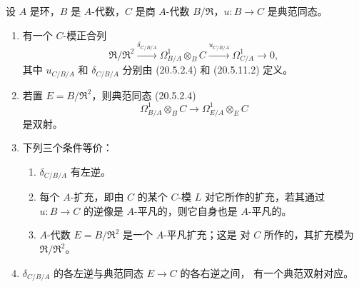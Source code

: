 \begin{theorem}[20.5.12]
\label{0.20.5.12-fr}
设 $A$ 是环，$B$ 是 $A$-代数，$C$ 是商 $A$-代数
$B/\mathfrak{R}$，$u:B\to C$ 是典范同态。
\begin{enumerate}
  \item[\rm(i)] 有一个 $C$-模正合列
\begin{equation}
\tag{20.5.12.1}
\label{0.20.5.12.1-fr}
  \mathfrak{R}/\mathfrak{R}^2
  \xrightarrow{\delta_{C/B/A}}\Omega^1_{B/A}\otimes_B C
  \xrightarrow{u_{C/B/A}}\Omega^1_{C/A}\longrightarrow 0,
\end{equation}
其中 $u_{C/B/A}$ 和 $\delta_{C/B/A}$ 分别由 (20.5.2.4) 和
(20.5.11.2) 定义。
  \item[\rm(ii)] 若置 $E=B/\mathfrak{R}^2$，则典范同态 (20.5.2.4)
\[
  \Omega^1_{B/A}\otimes_B C\longrightarrow
  \Omega^1_{E/A}\otimes_E C
\]
是双射。
  \item[\rm(iii)] 下列三个条件等价：
  \begin{enumerate}
    \item[\rm a)] $\delta_{C/B/A}$ 有左逆。
    \item[\rm b)] 每个 $A$-扩充，即由 $C$ 的某个 $C$-模 $L$ 对它所作的扩充，若其通过
    $u:B\to C$ 的逆像是 $A$-平凡的，则它自身也是 $A$-平凡的。
    \item[\rm c)] $A$-代数 $E=B/\mathfrak{R}^2$ 是一个 $A$-平凡扩充；这是
    对 $C$ 所作的，其扩充模为 $\mathfrak{R}/\mathfrak{R}^2$。
  \end{enumerate}
  \item[\rm(iv)] $\delta_{C/B/A}$ 的各左逆与典范同态 $E\to C$ 的各右逆之间，
  有一个典范双射对应。
\end{enumerate}
\end{theorem}

